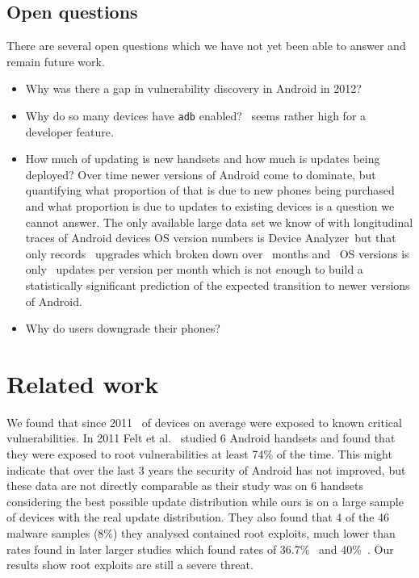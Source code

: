 \documentclass[conference,a4paper,twoside]{IEEEtran}
\newcommand{\da}{Device Analyzer}
\begin{document}
\subsection{Open questions}
There are several open questions which we have not yet been able to answer and remain future work.
\begin{itemize}
 \item Why was there a gap in vulnerability discovery in Android in 2012?
 \item Why do so many devices have \texttt{adb} enabled? \daAdbEnabledPerc\ seems rather high for a developer feature.
 \item How much of updating is new handsets and how much is updates being deployed? Over time newer versions of Android come to dominate, but quantifying what proportion of that is due to new phones being purchased and what proportion is due to updates to existing devices is a question we cannot answer.
 The only available large data set we know of with longitudinal traces of Android devices OS version numbers is \da\ but that only records \daNumUpdatesUpgrades\ upgrades which broken down over \daOSMonthsOfData\ months and \daNumSigOSVersions\ OS versions is only \daUpdatesPerMonthPerVersion\ updates per version per month which is not enough to build a statistically significant prediction of the expected transition to newer versions of Android.
 \item Why do users downgrade their phones?
\end{itemize}


\section{Related work}
\label{sec:related}
We found that since 2011 \daMeanInsecurityPerc\ of devices on average were exposed to known critical vulnerabilities.
In 2011 Felt et al.\ \cite{Felt2011} studied 6 Android handsets and found that they were exposed to root vulnerabilities at least 74\% of the time.
This might indicate that over the last 3 years the security of Android has not improved, but these data are not directly comparable as their study was on 6 handsets considering the best possible update distribution while ours is on a large sample of devices with the real update distribution.
They also found that 4 of the 46 malware samples (8\%) they analysed contained root exploits, much lower than rates found in later larger studies which found rates of 36.7\%~\cite{Zhou2012b} and 40\%~\cite{Zhou2012a}.
Our results show root exploits are still a severe threat.
\end{document}
